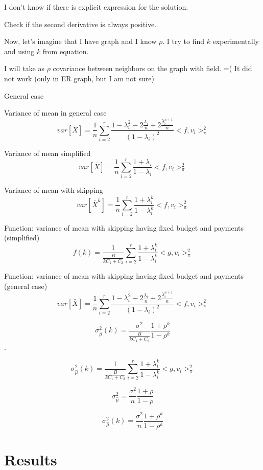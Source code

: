 \documentclass[12pt]{report}
\begin{document}
I don't know if there is explicit expression for the solution.


Check if the second derivative is always positive.

Now, let's imagine that I have graph and I know $\rho$. I try to find $k$ experimentally and using $k$ from equation.

I will take as $\rho$ covariance between neighbors on the graph with field.
=(  It did not work (only in ER graph, but I am not sure)


General case

Variance of mean in general case
$$ var\left[\bar{X} \right] = \frac{1}{n} \sum_{i=2}^r\frac{1-\lambda_i^2 - 2\frac{\lambda_i}{n} + 2\frac{\lambda_i^{n+1}}{n}}{(1 - \lambda_i)^2} <f, v_i>^2_{\pi}$$


Variance of mean simplified
$$ var\left[\bar{X} \right] = \frac{1}{n} \sum_{i=2}^r\frac{1 + \lambda_i}{1 - \lambda_i} <f, v_i>^2_{\pi}$$

Variance of mean with skipping
$$ var\left[\bar{X}^k \right] = \frac{1}{n} \sum_{i=2}^r\frac{1 + \lambda_i^k}{1 - \lambda_i^k} <f, v_i>^2_{\pi}$$

Function: variance of mean with skipping having fixed budget and payments (simplified)
$$ f(k) = \frac{1}{\frac{B}{kC_1 + C_2}} \sum_{i=2}^r\frac{1 + \lambda_i^k}{1 - \lambda_i^k} <g, v_i>^2_{\pi}$$

Function: variance of mean with skipping having fixed budget and payments (general case)
$$ var\left[\bar{X} \right] = \frac{1}{n} \sum_{i=2}^r\frac{1-\lambda_i^2 - 2\frac{\lambda_i}{n} + 2\frac{\lambda_i^{n+1}}{n}}{(1 - \lambda_i)^2} <f, v_i>^2_{\pi}$$



$$ \sigma_{\hat{\mu}}^2(k) = \frac{\sigma^2}{\frac{B}{kC_1 + C_2}} \frac{1+\rho^{k}}{1-\rho^{k}}$$.

$$  \sigma_{\hat{\mu}}^2(k) = \frac{1}{\frac{B}{kC_1 + C_2}} \sum_{i=2}^r\frac{1 + \lambda_i^k}{1 - \lambda_i^k} <g, v_i>^2_{\pi}$$



$$\sigma_{\hat{\mu}}^2 = \frac{\sigma^2}{n} \frac{1+\rho}{1-\rho}$$

$$\sigma_{\hat{\mu}}^2(k) = \frac{\sigma^2}{n} \frac{1+\rho^k}{1-\rho^k}$$


\chapter{Results}
\end{document}
